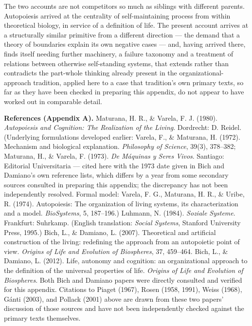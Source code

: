 \documentclass[11pt]{article}
\theoremstyle{plain}
\begin{document}
The two accounts are not competitors so much as siblings with different parents. Autopoiesis arrived at the centrality of self-maintaining process from within theoretical biology, in service of a definition of life. The present account arrives at a structurally similar primitive from a different direction --- the demand that a theory of boundaries explain its own negative cases --- and, having arrived there, finds itself needing further machinery, a failure taxonomy and a treatment of relations between otherwise self-standing systems, that extends rather than contradicts the part-whole thinking already present in the organizational-approach tradition, applied here to a case that tradition's own primary texts, so far as they have been checked in preparing this appendix, do not appear to have worked out in comparable detail.

\textbf{References (Appendix A).} Maturana, H. R., \& Varela, F. J. (1980). \emph{Autopoiesis and Cognition: The Realization of the Living}. Dordrecht: D. Reidel. (Underlying formulations developed earlier: Varela, F., \& Maturana, H. (1972). Mechanism and biological explanation. \emph{Philosophy of Science}, 39(3), 378--382; Maturana, H., \& Varela, F. (1973). \emph{De Máquinas y Seres Vivos}. Santiago: Editorial Universitaria --- cited here with the 1973 date given in Bich and Damiano's own reference lists, which differs by a year from some secondary sources consulted in preparing this appendix; the discrepancy has not been independently resolved. Formal model: Varela, F. G., Maturana, H. R., \& Uribe, R. (1974). Autopoiesis: The organization of living systems, its characterization and a model. \emph{BioSystems}, 5, 187--196.) Luhmann, N. (1984). \emph{Soziale Systeme}. Frankfurt: Suhrkamp. (English translation: \emph{Social Systems}, Stanford University Press, 1995.) Bich, L., \& Damiano, L. (2007). Theoretical and artificial construction of the living: redefining the approach from an autopoietic point of view. \emph{Origins of Life and Evolution of Biospheres}, 37, 459--464. Bich, L., \& Damiano, L. (2012). Life, autonomy and cognition: an organizational approach to the definition of the universal properties of life. \emph{Origins of Life and Evolution of Biospheres}. Both Bich and Damiano papers were directly consulted and verified for this appendix. Citations to Piaget (1967), Rosen (1958, 1991), Weiss (1968), Gánti (2003), and Pollack (2001) above are drawn from these two papers' discussion of those sources and have not been independently checked against the primary texts themselves.
\end{document}
